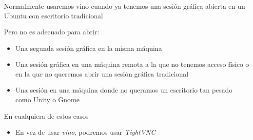 \documentclass[ucs]{beamer}
\begin{document}
\begin{frame}[fragile]
\frametitle{}
Normalmente usaremos vino cuando ya tenemos una sesión gráfica 
abierta en un Ubuntu con escritorio tradicional


Pero no es adecuado para abrir:
\begin{itemize}
\item
Una segunda sesión gráfica en la misma máquina

\item
Una sesión gráfica en una máquina remota a la que no
tenemos acceso físico o en la que no queremos abrir una sesión gráfica
tradicional

\item
Una sesión en una máquina donde no queramos un escritorio tan pesado
como Unity o Gnome

\end{itemize}


En cualquiera de estos casos

\begin{itemize}
\item
En vez de usar 
\emph{vino},
 podremos usar 
\emph{TightVNC}

\end{itemize}

\end{frame}
\end{document}
